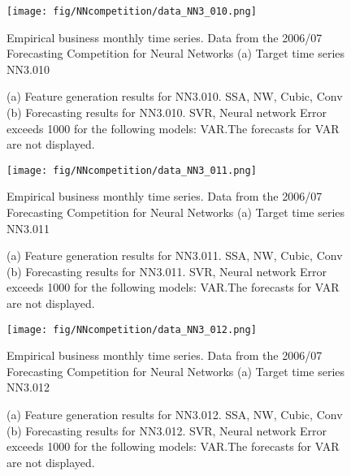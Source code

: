 \documentclass[12pt]{article}
\begin{document}
\begin{figure}
\centering
\texttt{[image: fig/NNcompetition/data\_NN3\_010.png]}
\caption{Empirical business monthly time series. Data from the 2006/07 Forecasting Competition for Neural Networks	(a) Target time series	NN3.010	}
\end{figure}


\begin{figure}
\centering
{}
\caption{(a)	Feature generation results for	NN3.010.	SSA, NW, Cubic, Conv	(b)	Forecasting results for	NN3.010.	SVR, Neural network	Error exceeds 1000 for the following models: VAR.The forecasts for VAR are not displayed.	}
\end{figure}


\begin{figure}
\centering
\texttt{[image: fig/NNcompetition/data\_NN3\_011.png]}
\caption{Empirical business monthly time series. Data from the 2006/07 Forecasting Competition for Neural Networks	(a) Target time series	NN3.011	}
\end{figure}


\begin{figure}
\centering
{}
\caption{(a)	Feature generation results for	NN3.011.	SSA, NW, Cubic, Conv	(b)	Forecasting results for	NN3.011.	SVR, Neural network	Error exceeds 1000 for the following models: VAR.The forecasts for VAR are not displayed.	}
\end{figure}


\begin{figure}
\centering
\texttt{[image: fig/NNcompetition/data\_NN3\_012.png]}
\caption{Empirical business monthly time series. Data from the 2006/07 Forecasting Competition for Neural Networks	(a) Target time series	NN3.012	}
\end{figure}


\begin{figure}
\centering
{}
\caption{(a)	Feature generation results for	NN3.012.	SSA, NW, Cubic, Conv	(b)	Forecasting results for	NN3.012.	SVR, Neural network	Error exceeds 1000 for the following models: VAR.The forecasts for VAR are not displayed.	}
\end{figure}
\end{document}
